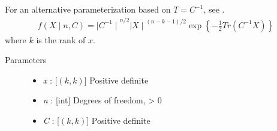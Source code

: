 \documentclass[]{jss}
\begin{document}
For an alternative parameterization based on $T=C^{-1}$, see
.
\begin{eqnarray*}
f(X \mid n, C) = {\mid C^{-1} \mid}^{n/2}{\mid X \mid}^{(n-k-1)/2} \exp\left\{ -\frac{1}{2} Tr(C^{-1}X) \right\}    
\end{eqnarray*}
where $k$ is the rank of $x$.
\begin{description}
\item[Parameters] \leavevmode\begin{itemize}
\item{}
\emph{x} : [$(k,k)$] Positive definite

\item{}
\emph{n} : [int] Degrees of freedom, \textgreater{} 0

\item{}
\emph{C} : [$(k,k)$] Positive definite

\end{itemize}

\end{description}
\normalsize


\newpage

\nocite{Bernardo:1992fk}

\end{document}
